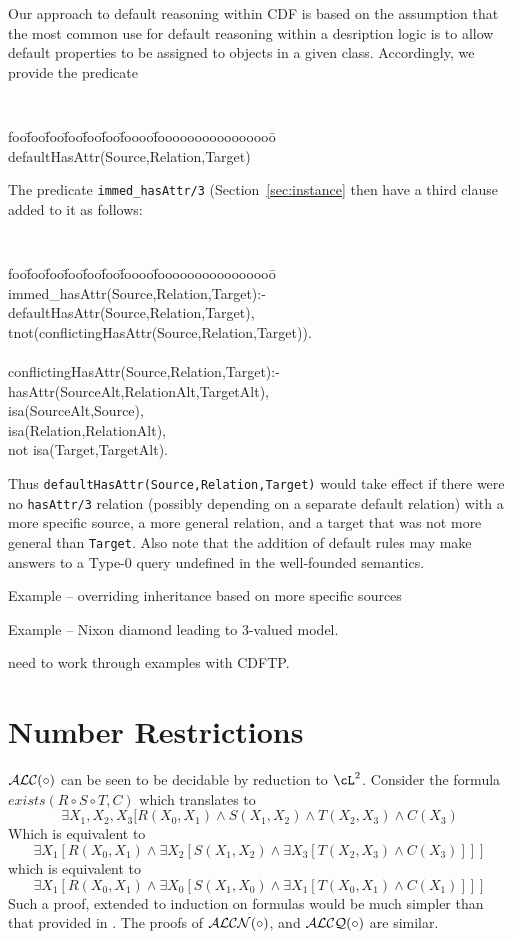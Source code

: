 Our approach to default reasoning within CDF is based on the
assumption that the most common use for default reasoning within a
desription logic is to allow default properties to be assigned to
objects in a given class.  Accordingly, we provide the predicate
{\small {\tt 
\begin{tabbing}
foo\=foo\=foo\=foo\=foo\=foo\=foooo\=foooooooooooooooo\=\kill
\> defaultHasAttr(Source,Relation,Target)
\end{tabbing}
} }
%
\noindent
The predicate {\tt immed\_hasAttr/3} (Section~\ref{sec:instance}
then have a third clause added to it as follows:
{\small {\tt 
\begin{tabbing}
foo\=foo\=foo\=foo\=foo\=foo\=foooo\=foooooooooooooooo\=\kill
\> immed\_hasAttr(Source,Relation,Target):-  \\ 
\> \> 	defaultHasAttr(Source,Relation,Target), \\
\> \> 	tnot(conflictingHasAttr(Source,Relation,Target)). \\
\> \\
\> conflictingHasAttr(Source,Relation,Target):-  \\
\> \> hasAttr(SourceAlt,RelationAlt,TargetAlt), \\
\> \> isa(SourceAlt,Source), \\
\> \> isa(Relation,RelationAlt), \\
\> \> not isa(Target,TargetAlt).
\end{tabbing}
} }
%
Thus {\tt defaultHasAttr(Source,Relation,Target)} would take effect if
there were no {\tt hasAttr/3} relation (possibly depending on a
separate default relation) with a more specific source, a more general
relation, and a target that was not more general than {\tt Target}.
Also note that the addition of default rules may make answers to a
Type-0 query undefined in the well-founded semantics.

{\sc Example -- overriding inheritance based on more specific sources}

{\sc Example -- Nixon diamond leading to 3-valued model.}

{\sc need to work through examples with CDFTP}.

\section{Number Restrictions}

${\cal ALC}(\circ)$ can be seen to be decidable by reduction to
$\cL^2$.  Consider the formula $exists(R \circ S \circ T,C)$ which
translates to 
\[
\exists X_1,X_2,X_3 [R(X_0,X_1) \wedge S(X_1,X_2) \wedge T(X_2,X_3)
	\wedge C(X_3)
\]
Which is equivalent to 
\[
\exists X_1 [R(X_0,X_1) \wedge \exists X_2 [S(X_1,X_2) \wedge 
	\exists X_3 [T(X_2,X_3) \wedge C(X_3) ] ] ]
\]
which is equivalent to 
\[
\exists X_1 [R(X_0,X_1) \wedge \exists X_0 [S(X_1,X_0) \wedge 
	\exists X_1 [T(X_0,X_1) \wedge C(X_1) ] ] ]
\]
Such a proof, extended to induction on formulas would be much simpler
than that provided in \cite{BaaS99}. The proofs of ${\cal
ALCN}(\circ)$, and ${\cal ALCQ}(\circ)$ are similar.

